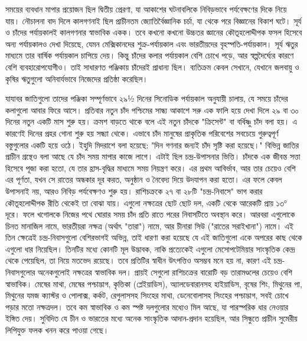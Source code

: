 সময়ের ব্যবধান মাপার প্রয়োজন ছিল দ্বিতীয় প্রেরণা, যা আকাশের ঘটনাবলিকে নিবিড়ভাবে পর্যবেক্ষণের দিকে নিয়ে যায়। নৌচালনা বাদ দিলে কালগণনাই ছিল প্রাচীনতম জ্যোতির্বৈজ্ঞানিক চর্চা, যা থেকে পরে বিজ্ঞানের বিকাশ ঘটে। সূর্য ও চাঁদের পর্যায়কালই কালগণনার স্বাভাবিক একক। তবে কখনো কখনো উচ্চতর জ্ঞানের কৌতূহলোদ্দীপক ফসল হিসেবে অন্য পর্যায়কালও দেখা দিয়েছে, যেমন মেক্সিকানদের শুক্র-পর্যায়কাল এবং ভারতীয়দের বৃহস্পতি-পর্যায়কাল। সূর্য ঋতুর মাধ্যমে তার বার্ষিক পর্যায়কাল চাপিয়ে দেয়। কিন্তু চাঁদের কলার পর্যায়কাল বেশি চোখে পড়ে, আর স্বল্পদৈর্ঘ্যের কারণে বেশি ব্যবহারোপযোগীও। তাই সাধারণত পঞ্জিকায় চাঁদেরই প্রাধান্য ছিল। ব্যতিক্রম কেবল সেখানে, যেখানে জলবায়ু ও কৃষির ঋতুগুলো অনিবার্যভাবে নিজেদের প্রতিষ্ঠা করেছিল।

যাযাবর জাতিগুলো তাদের পঞ্জিকা সম্পূর্ণভাবে ২৯½ দিনের সিনোডিক পর্যায়কাল অনুযায়ী চালায়, যে সময়ে চাঁদের কলাগুলো আবার ফিরে আসে। প্রতিবার নতুন চাঁদ পশ্চিমের সান্ধ্য আকাশে সরু এক ফালি হয়ে দেখা দিলে ২৯ বা ৩০ দিনের নতুন একটি মাস শুরু হয়। ক্রমশ বাড়তে থাকে বলে এই নতুন চাঁদকে "ক্রিসেন্ট" বা বর্ধিষ্ণু চাঁদ বলা হয়। এ কারণেই দিনের প্রহর গোনা শুরু হয় সন্ধ্যা থেকে। এভাবে চাঁদ মানুষের প্রাকৃতিক পরিবেশের সবচেয়ে গুরুত্বপূর্ণ বস্তুগুলোর একটি হয়ে ওঠে। ইহুদি মিদরাশে বলা হয়েছে: "দিন গণনার জন্যই চাঁদ সৃষ্টি করা হয়েছে।" বিভিন্ন জাতির প্রাচীন গ্রন্থেও বলা আছে যে চাঁদ সময় মাপার কাজে লাগে। এটাই ছিল চন্দ্র-উপাসনার ভিত্তি। চাঁদকে এক জীবন্ত সত্তা হিসেবে পূজা করা হতো, যে তার হ্রাস-বৃদ্ধির মাধ্যমে সময় নিয়ন্ত্রণ করে। এর প্রথম আবির্ভাব, আর তার চেয়েও বেশি এর পূর্ণতা, যখন সে রাতের অন্ধকার দূর করত, অনুষ্ঠান ও নৈবেদ্য দিয়ে উদযাপন করা হতো।
এর ফলে কেবল উপাসনাই নয়, আরও নিবিড় পর্যবেক্ষণও শুরু হয়। রাশিচক্রকে ২৭ বা ২৮টি "চন্দ্র-নিবাসে" ভাগ করার কৌতূহলোদ্দীপক রীতি থেকেই তা বোঝা যায়। এগুলো নক্ষত্রের ছোট ছোট দল, একটি থেকে আরেকটি প্রায় ১৩° দূরে। ফলে খগোলকে নিজের পথে ঘোরার সময় চাঁদ প্রতি রাতে পরের নিবাসটিতে অবস্থান করে। আরবরা এগুলোকে চিনত মানাজিল নামে, ভারতীয়রা নক্ষত্র (অর্থাৎ "তারা") নামে, আর চীনারা সিউ ("রাতের সরাইখানা") নামে। এই তিন ক্ষেত্রেই চন্দ্র-নিবাসগুলো বেশিরভাগই অভিন্ন, তাই ধারণা করা হয়েছে যে এই জাতিগুলো একে অপরের কাছ থেকে এগুলো ধার নিয়েছিল। তিনটির মধ্যে কোনটি মূল উদ্ভাবক, নাকি প্রত্যেকেই এগুলো মেসোপটেমিয়ার সাংস্কৃতিক কেন্দ্র থেকে পেয়েছিল, তা নিয়ে মতভেদ রয়েছে। তবে প্রতিটির স্বাধীন উৎপত্তিও অসম্ভব মনে হয় না, কারণ এই চন্দ্র-নিবাসগুলোর অনেকগুলোই নক্ষত্রের স্বাভাবিক দল। প্রায়ই সেগুলো রাশিচক্রের বারোটি বড় তারামণ্ডলের চেয়েও বেশি স্বাভাবিক। মেষের মাথা, মেষের পশ্চাদ্ভাগ, কৃত্তিকা (প্লেইয়াডিস), অ্যালডেবারানসহ হাইয়াডিস, বৃষের শিং, মিথুনের পা, মিথুনের যমজ ক্যাস্টর ও পোলাক্স, কর্কট, রেগুলাসসহ সিংহের মাথা, ডেনেবোলাসহ সিংহের পশ্চাদ্ভাগ, সবই চোখে পড়ার মতো নক্ষত্রদল। তবে কম স্বাভাবিক ও কম স্পষ্ট দলগুলোর মধ্যেও মিল আছে, যা পারস্পরিক ধার নেওয়ার ইঙ্গিত দেয়। সুবিদিত যে চীন ও ভারতের মধ্যে অনেক সাংস্কৃতিক আদান-প্রদান হয়েছিল, আর সিন্ধুতে প্রাচীন সুমেরীয় লিপিযুক্ত ফলক খনন করে পাওয়া গেছে।

